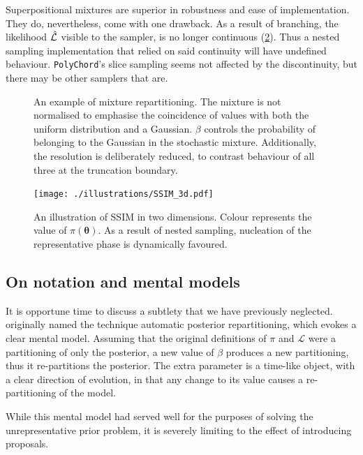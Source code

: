 \documentclass[usenatbib]{mnras}
\begin{document}
Superpositional mixtures are superior in robustness and ease of
implementation. They do, nevertheless, come with one drawback. As a
result of branching, the likelihood $\hat{\cal L}$ visible to the
sampler, is no longer continuous (\cref{fig:mixture-3d}). Thus a
nested sampling implementation that relied on said continuity will
have undefined behaviour. \texttt{PolyChord}'s slice sampling seems
not affected by the discontinuity, but there may be other samplers
that are.
\begin{figure}  
  

  

  
  \caption{An example of mixture repartitioning. The mixture is not
    normalised to emphasise the coincidence of values with both the
    uniform distribution and a Gaussian. $\beta$ controls the
    probability of belonging to the Gaussian in the stochastic
    mixture.  Additionally, the resolution is deliberately reduced, to
    contrast behaviour of all three at the truncation
    boundary. \label{fig:mixture}}
\end{figure}

\begin{figure}
  \centering
  \texttt{[image: ./illustrations/SSIM\_3d.pdf]}
  \caption{An illustration of SSIM in two dimensions. Colour represents the value of $\pi(\bm{\theta})$. As a result of nested sampling, nucleation of the representative phase is dynamically favoured.}
  \label{fig:mixture-3d}
\end{figure}

\subsection{On notation and mental models}

It is opportune time to discuss a subtlety that we have previously
neglected. \Cite{chen-ferroz-hobson} originally named the technique
automatic posterior repartitioning, which evokes a clear mental
model. Assuming that the original definitions of \( \pi \) and
\(\mathcal{L}\) were a partitioning of only the posterior, a new value
of \(\beta\) produces a new partitioning, thus it re-partitions the
posterior.  The extra parameter is a time-like object, with a clear
direction of evolution, in that any change to its value causes a
re-partitioning of the model.

While this mental model had served well for the purposes of solving
the unrepresentative prior problem, it is severely limiting to the
effect of introducing proposals.
\end{document}
